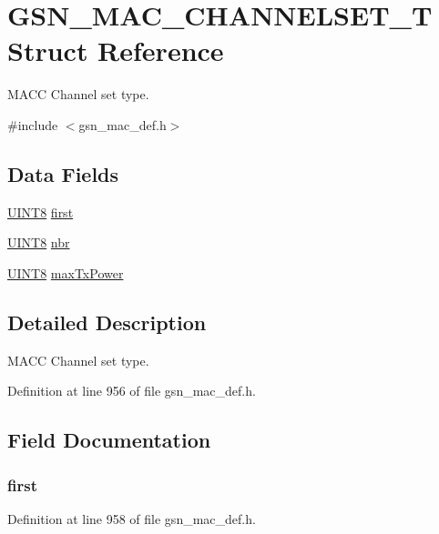 \hypertarget{a00114}{
\section{GSN\_\-MAC\_\-CHANNELSET\_\-T Struct Reference}
\label{a00114}
}


MACC Channel set type.  




{\ttfamily \#include $<$gsn\_\-mac\_\-def.h$>$}

\subsection*{Data Fields}
\begin{DoxyCompactItemize}
\item 
\hyperlink{a00660_gab27e9918b538ce9d8ca692479b375b6a}{UINT8} \hyperlink{a00114_a5b31957129e1979483c8bd10a96752bc}{first}
\item 
\hyperlink{a00660_gab27e9918b538ce9d8ca692479b375b6a}{UINT8} \hyperlink{a00114_a5e8cc5c50451b8cd569f6b857ca93729}{nbr}
\item 
\hyperlink{a00660_gab27e9918b538ce9d8ca692479b375b6a}{UINT8} \hyperlink{a00114_a7cd081227ed796284bdbaf79788a39a5}{maxTxPower}
\end{DoxyCompactItemize}


\subsection{Detailed Description}
MACC Channel set type. 

Definition at line 956 of file gsn\_\-mac\_\-def.h.



\subsection{Field Documentation}
\hypertarget{a00114_a5b31957129e1979483c8bd10a96752bc}{
\subsubsection[{first}]{ {\bf first}}}
\label{a00114_a5b31957129e1979483c8bd10a96752bc}


Definition at line 958 of file gsn\_\-mac\_\-def.h.

